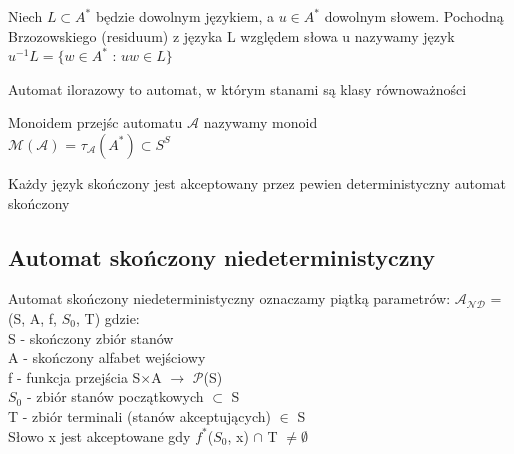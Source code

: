 \documentclass[main.tex]{subfiles}
\begin{document}
    \begin{definition}
        Niech $L \subset  A^{*}$ będzie dowolnym językiem, a $u \in A^{*}$ dowolnym słowem.
        Pochodną Brzozowskiego (residuum) z języka L względem słowa u nazywamy język \\
        $u^{-1}L = \{w \in A^{*}$  :  $uw \in L \}$
    \end{definition}

    \begin{definition}
        Automat ilorazowy to automat, w którym stanami są klasy równoważności
    \end{definition}

    \begin{definition}
        Monoidem przejśc automatu $\mathcal{A}$ nazywamy monoid \\
        $\mathcal{M(A)}$ = $\tau_\mathcal{A}(A^*) \subset S^{S}$
    \end{definition}

    \begin{definition}
        Każdy język skończony jest akceptowany przez pewien deterministyczny automat skończony
    \end{definition}

    \subsection{Automat skończony niedeterministyczny}
    \begin{definition}
        Automat skończony niedeterministyczny oznaczamy piątką parametrów: $\mathcal{A_{ND}}$ = (S, A, f, $S_{0}$, T) gdzie: \\
        S - skończony zbiór stanów \\
        A - skończony alfabet wejściowy \\
        f - funkcja przejścia S$\times$A $\rightarrow$ $\mathcal{P}$(S) \\
        $S_{0}$ - zbiór stanów początkowych $\subset$ S\\
        T - zbiór terminali (stanów akceptujących) $\in$ S \\

        Słowo x jest akceptowane gdy $f^{*}$($S_{0}$, x) $\cap$ T $\neq \emptyset$
    \end{definition}
\end{document}
